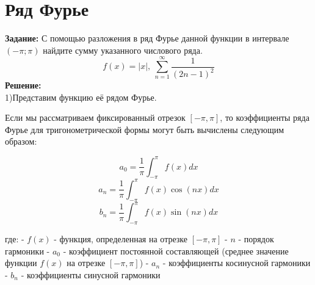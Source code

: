 \documentclass{article}
\begin{document}
\section{Ряд Фурье}


\textbf{Задание:} С помощью разложения в ряд Фурье данной функции в интервале $(-\pi;\pi)$ найдите сумму
указанного числового ряда.\\
\[
    f(x)=|x|,\ \sum_{n=1}^{\infty}\frac{1}{(2n-1)^2}
\]
\textbf{Решение:}\\


1)Представим функцию её рядом Фурье.\\
\begin{center}
\end{center}


Если мы рассматриваем фиксированный отрезок \([- \pi, \pi]\), то коэффициенты ряда Фурье для тригонометрической формы могут быть вычислены следующим образом:

\[a_0 = \frac{1}{\pi} \int_{-\pi}^{\pi} f(x) dx\]
\[a_n = \frac{1}{\pi} \int_{-\pi}^{\pi} f(x) \cos(n x) dx\]
\[b_n = \frac{1}{\pi} \int_{-\pi}^{\pi} f(x) \sin(n x) dx\]

где:
- \(f(x)\) - функция, определенная на отрезке \([- \pi, \pi]\)
- \(n\) - порядок гармоники
- \(a_0\) - коэффициент постоянной составляющей (среднее значение функции \(f(x)\) на отрезке \([- \pi, \pi]\))
- \(a_n\) - коэффициенты косинусной гармоники
- \(b_n\) - коэффициенты синусной гармоники
\end{document}
